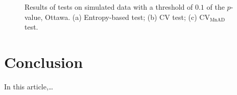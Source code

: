 \documentclass[remotesensing,article,submit,moreauthors,pdftex]{Definitions/mdpi}
\begin{document}
\begin{figure}[H]

{\centering {}

}

\caption{Results of tests on simulated data with a threshold of $0.1$ of the $p$-value, Ottawa. (a) Entropy-based test; (b) CV test; (c) $\text{CV}_{\text{MnAD}}$ test.}\label{fig:sim_SAR_Images_01_Ottawa}
\end{figure}

\hypertarget{sec:conclusion}{%
\section{Conclusion}\label{sec:conclusion}}

In this article,\ldots{}


\vspace{6pt}
\end{document}

